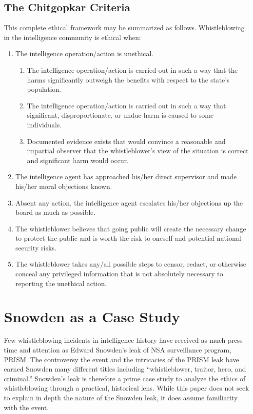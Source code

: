 \documentclass [12 pt] {article}
\begin{document}
\subsection {The Chitgopkar Criteria}
This complete ethical framework may be summarized as follows.
\bigbreak
Whistleblowing in the intelligence community is ethical when:
\begin {enumerate}
\item The intelligence operation/action is unethical.
  \begin {enumerate}
  \item The intelligence operation/action is carried out in such a way that the harms significantly outweigh the benefits with respect to the state's population.
  \item The intelligence operation/action is carried out in such a way that significant, disproportionate, or undue harm is caused to some individuals.
  \item Documented evidence exists that would convince a reasonable and impartial observer that the whistleblower's view of the situation is correct and significant harm would occur.
  \end {enumerate}
\item The intelligence agent has approached his/her direct supervisor and made his/her moral objections known.
\item Absent any action, the intelligence agent escalates his/her objections up the board as much as possible.
\item The whistleblower believes that going public will create the necessary change to protect the public and is worth the risk to oneself and potential national security risks.
\item The whistleblower takes any/all possible steps to censor, redact, or otherwise conceal any privileged information that is not absolutely necessary to reporting the unethical action.
\end {enumerate}
\section {Snowden as a Case Study}
Few whistleblowing incidents in intelligence history have received as much press time and attention as Edward Snowden's leak of NSA surveillance program, PRISM. The controversy the event and the intricacies of the PRISM leak have earned Snowden many different titles including ``whistleblower, traitor, hero, and criminal.'' Snowden's leak is therefore a prime case study to analyze the ethics of whistleblowing through a practical, historical lens. While this paper does not seek to explain in depth the nature of the Snowden leak, it does assume familiarity with the event.
\bigbreak
\end{document}
